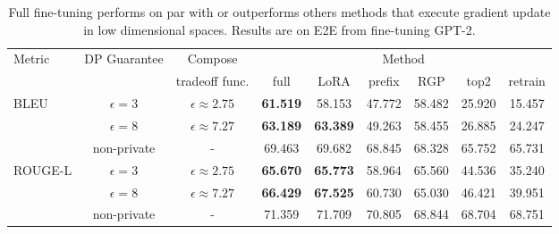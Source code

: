 \setlength{\tabcolsep}{2.5pt}
\renewcommand{\arraystretch}{0.75}
\begin{table}[thb]
\footnotesize
\caption{
Full fine-tuning performs on par with or outperforms others methods that execute gradient update in low dimensional spaces.
Results are on E2E from fine-tuning GPT-2.
}
\centering
\begin{tabular}{l c c cccccc}
\toprule
\multirow{2}[0]{*}{Metric} & \multirow{2}[0]{*}{DP Guarantee} & Compose & \multicolumn{6}{c}{Method}  \\
 & & tradeoff func. & {full} & {LoRA} & {prefix} & {RGP} & {top2} & {retrain} \\

\midrule
\multirow{3}[1]{*}{BLEU}
 & $\epsilon=3$ &  $\epsilon \approx 2.75$ & \textbf{ 61.519 } & 58.153 & 47.772 & 58.482 & 25.920 & 15.457\\
 & $\epsilon=8$ &  $\epsilon \approx 7.27$ & \textbf{63.189} & \textbf{ 63.389 } & 49.263 & 58.455 & 26.885 & 24.247\\
 & non-private & - & 69.463 & 69.682 & 68.845 & 68.328 & 65.752 & 65.731\\
\midrule
\multirow{3}[1]{*}{ROUGE-L}
 & $\epsilon=3$ & $\epsilon \approx 2.75$ & \textbf{65.670} & \textbf{ 65.773 } & 58.964 & 65.560 & 44.536 & 35.240\\
 & $\epsilon=8$ & $\epsilon \approx 7.27$ & \textbf{66.429} & \textbf{ 67.525 } & 60.730 & 65.030 & 46.421 & 39.951\\
 & non-private & - & 71.359 & 71.709 & 70.805 & 68.844 & 68.704 & 68.751\\
\bottomrule
\end{tabular}
\label{table:e2e_trim}
\end{table}
